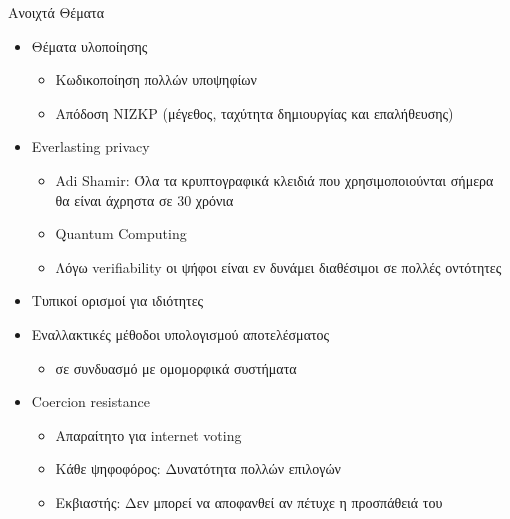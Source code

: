 \documentclass[handout]{beamer}
\begin{document}
\begin{frame}{Ανοιχτά Θέματα} 
\begin{adjustwidth}{-2em}{-2em}
    \begin{multicols}{2}
    \begin{small}
    \begin{itemize}
    \setlength\itemsep{0.1em}
        \item Θέματα υλοποίησης
        \begin{itemize}\setlength\itemsep{0.1em}
            \item Κωδικοποίηση πολλών υποψηφίων
            \item Απόδοση NIZKP (μέγεθος, ταχύτητα δημιουργίας και επαλήθευσης)
        \end{itemize} \pause
        \item Everlasting privacy
        \begin{itemize}\setlength\itemsep{0.1em}
            \item Adi Shamir: Όλα τα κρυπτογραφικά κλειδιά που χρησιμοποιούνται σήμερα θα είναι άχρηστα σε 30 χρόνια
            \item Quantum Computing
            \item Λόγω verifiability οι ψήφοι είναι εν δυνάμει διαθέσιμοι σε πολλές οντότητες
        \end{itemize} \pause
        \columnbreak
        \item Τυπικοί ορισμοί για ιδιότητες
        \item Εναλλακτικές μέθοδοι υπολογισμού αποτελέσματος
        \begin{itemize}\setlength\itemsep{0.1em}
            \item σε συνδυασμό με ομομορφικά συστήματα
        \end{itemize} \pause
        \item Coercion resistance 
        \begin{itemize}\setlength\itemsep{0.1em}
            \item Απαραίτητο για internet voting
            \item Κάθε ψηφοφόρος: Δυνατότητα πολλών επιλογών
            \item Εκβιαστής: Δεν μπορεί να αποφανθεί αν πέτυχε η προσπάθειά του
        \end{itemize}
    \end{itemize}
    \end{small}
    \end{multicols}
    \end{adjustwidth}
\end{frame}
\end{document}
